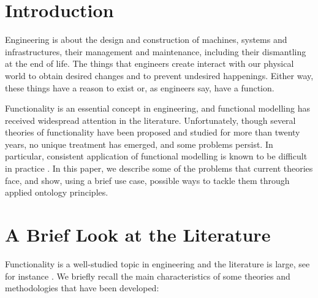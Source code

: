 \documentclass[
]{ceurart}
\begin{document}
\maketitle


\section{Introduction}
    
Engineering is about the design and construction of machines, systems and infrastructures, their management and maintenance, including their dismantling at the end of life. The things that engineers create interact with our physical world to obtain desired changes and to prevent undesired happenings. Either way, these things have a reason to exist or, as engineers say, have a function. 

Functionality is an essential concept in engineering, and functional modelling has received widespread attention in the literature. 
Unfortunately, though several theories of functionality have been proposed and studied for more than twenty years, no unique treatment has emerged, and some problems persist. In particular, consistent application of functional modelling is known to be difficult in practice \cite{eckertThatWhichNot2013}.
In this paper, we describe some of the problems that current theories face, and show, using a brief use case, possible ways to tackle them through applied ontology principles.

\section{A Brief Look at the Literature}\label{sec:literature}

Functionality is a well-studied topic in engineering and the literature is large, %
see for instance \cite{pahl_engineering_2007,erdenReviewFunctionModeling2008}. %
We briefly recall the main characteristics of some theories and methodologies that have been developed: %
\end{document}
